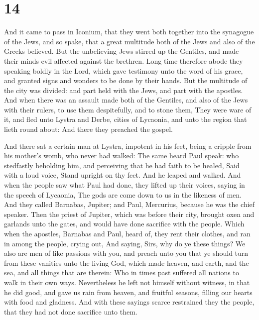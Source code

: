 \hypertarget{section-13}{%
\section{14}\label{section-13}}

 And it came to pass in Iconium, that they went both
together into the synagogue of the Jews, and so spake, that a great
multitude both of the Jews and also of the Greeks believed.
 But the unbelieving Jews stirred up the Gentiles, and
made their minds evil affected against the brethren.  Long
time therefore abode they speaking boldly in the Lord, which gave
testimony unto the word of his grace, and granted signs and wonders to
be done by their hands.  But the multitude of the city was
divided: and part held with the Jews, and part with the apostles.
 And when there was an assault made both of the Gentiles,
and also of the Jews with their rulers, to use them despitefully, and to
stone them,  They were ware of it, and fled unto Lystra
and Derbe, cities of Lycaonia, and unto the region that lieth round
about:  And there they preached the gospel.

 And there sat a certain man at Lystra, impotent in his
feet, being a cripple from his mother's womb, who never had walked:
 The same heard Paul speak: who stedfastly beholding him,
and perceiving that he had faith to be healed,  Said with
a loud voice, Stand upright on thy feet. And he leaped and walked.
 And when the people saw what Paul had done, they lifted
up their voices, saying in the speech of Lycaonia, The gods are come
down to us in the likeness of men.  And they called
Barnabas, Jupiter; and Paul, Mercurius, because he was the chief
speaker.  Then the priest of Jupiter, which was before
their city, brought oxen and garlands unto the gates, and would have
done sacrifice with the people.  Which when the apostles,
Barnabas and Paul, heard of, they rent their clothes, and ran in among
the people, crying out,  And saying, Sirs, why do ye
these things? We also are men of like passions with you, and preach unto
you that ye should turn from these vanities unto the living God, which
made heaven, and earth, and the sea, and all things that are therein:
 Who in times past suffered all nations to walk in their
own ways.  Nevertheless he left not himself without
witness, in that he did good, and gave us rain from heaven, and fruitful
seasons, filling our hearts with food and gladness.  And
with these sayings scarce restrained they the people, that they had not
done sacrifice unto them.

